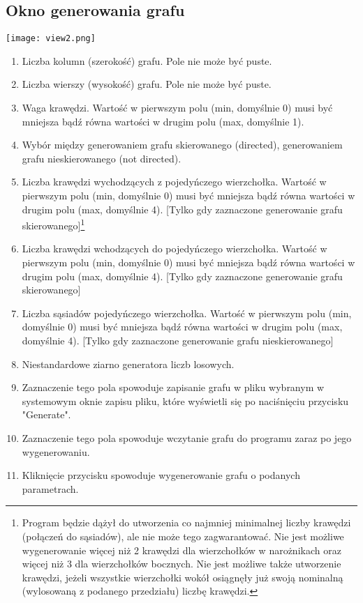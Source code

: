 \documentclass[11pt,a4paper]{report}
\begin{document}
    \subsection{Okno generowania grafu}

    \texttt{[image: view2.png]}

    \begin{enumerate}
        \item Liczba kolumn (szerokość) grafu. Pole nie może być puste.
        \item Liczba wierszy (wysokość) grafu. Pole nie może być puste.
        \item Waga krawędzi. Wartość w pierwszym polu (min, domyślnie 0) musi być mniejsza bądź równa wartości w drugim polu (max, domyślnie 1).
        \item Wybór między generowaniem grafu skierowanego (directed), generowaniem grafu nieskierowanego (not directed).
        \item Liczba krawędzi wychodzących z pojedyńczego wierzchołka. Wartość w pierwszym polu (min, domyślnie 0) musi być mniejsza bądź równa wartości w drugim polu (max, domyślnie 4). [Tylko gdy zaznaczone generowanie grafu skierowanego]\footnote{Program będzie dążył do utworzenia co najmniej minimalnej liczby krawędzi (połączeń do sąsiadów), ale nie może tego zagwarantować. Nie jest możliwe wygenerowanie więcej niż 2 krawędzi dla wierzchołków w narożnikach oraz więcej niż 3 dla wierzchołków bocznych. Nie jest możliwe także utworzenie krawędzi, jeżeli wszystkie wierzchołki wokół osiągnęły już swoją nominalną (wylosowaną z podanego przedziału) liczbę krawędzi.}
        \item Liczba krawędzi wchodzących do pojedyńczego wierzchołka. Wartość w pierwszym polu (min, domyślnie 0) musi być mniejsza bądź równa wartości w drugim polu (max, domyślnie 4). [Tylko gdy zaznaczone generowanie grafu skierowanego]\footnotemark[\value{footnote}]
        \item Liczba sąsiadów pojedyńczego wierzchołka. Wartość w pierwszym polu (min, domyślnie 0) musi być mniejsza bądź równa wartości w drugim polu (max, domyślnie 4). [Tylko gdy zaznaczone generowanie grafu nieskierowanego]\footnotemark[\value{footnote}]
        \item Niestandardowe ziarno generatora liczb losowych.
        \item Zaznaczenie tego pola spowoduje zapisanie grafu w pliku wybranym w systemowym oknie zapisu pliku, które wyświetli się po naciśnięciu przycisku "Generate".
        \item Zaznaczenie tego pola spowoduje wczytanie grafu do programu zaraz po jego wygenerowaniu.
        \item Kliknięcie przycisku spowoduje wygenerowanie grafu o podanych parametrach.
    \end{enumerate}
\end{document}
